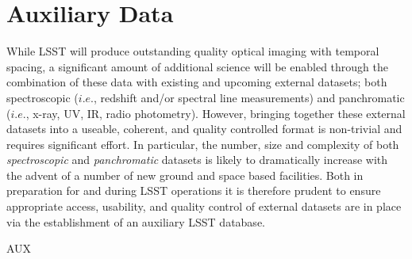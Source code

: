 \section{Auxiliary Data}\label{sec:tasks:aux}  
{\justify
While LSST will produce outstanding quality optical imaging with temporal spacing, a significant amount of additional science will be enabled through the combination of these data with existing and upcoming external datasets; both spectroscopic ($i.e.$, redshift and/or spectral line measurements) and panchromatic ($i.e.$, x-ray, UV, IR, radio photometry). However, bringing together these external datasets into a useable, coherent, and quality controlled format is non-trivial and requires significant effort. In particular, the number, size and complexity of both {\it spectroscopic} and {\it panchromatic} datasets is likely to dramatically increase with the advent of a number of new ground and space based facilities. Both in preparation for and during LSST operations it is therefore prudent to ensure appropriate access, usability, and quality control of external datasets are in place via the establishment of an auxiliary LSST database.



\begin{tasklist}{AUX}

\end{tasklist}}
